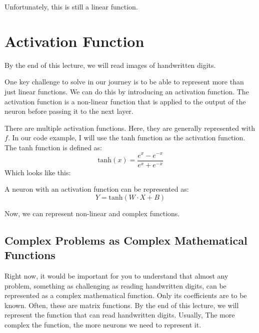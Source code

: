 \documentclass[12pt,a4paper]{article}
\begin{document}
Unfortunately, this is still a linear function.

\section{Activation Function}
By the end of this lecture, we will read images of handwritten digits.

One key challenge to solve in our journey is to be able to represent more than just linear functions. We can do this by introducing an activation function. The activation function is a non-linear function that is applied to the output of the neuron before passing it to the next layer.

There are multiple activation functions. Here, they are generally represented with $f$. In our code example, I will use the tanh function as the activation function. The tanh function is defined as:
\[
    \text{tanh}(x) = \frac{e^x - e^{-x}}{e^x + e^{-x}}
\]
Which looks like this:

\begin{center}
\end{center}

A neuron with an activation function can be represented as:
\[
    Y = \text{tanh}(W \cdot X + B)
\]

Now, we can represent non-linear and complex functions.
\subsection{Complex Problems as Complex Mathematical Functions}
Right now, it would be important for you to understand that almost any problem, something as challenging as reading handwritten digits, can be represented as a complex mathematical function. Only its coefficients are to be known. Often, these are matrix functions. By the end of this lecture, we will represent the function that can read handwritten digits. Usually, The more complex the function, the more neurons we need to represent it.
\end{document}
